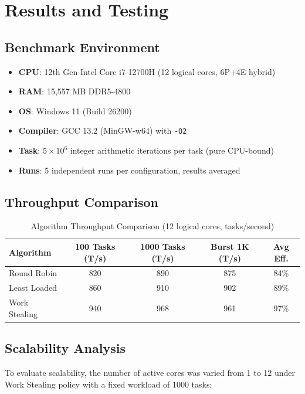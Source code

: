 \documentclass[12pt,a4paper]{article}
\begin{document}
\section{Results and Testing}

\subsection{Benchmark Environment}
\begin{itemize}
  \item \textbf{CPU}: 12th Gen Intel Core i7-12700H (12 logical cores, 6P+4E hybrid)
  \item \textbf{RAM}: 15,557 MB DDR5-4800
  \item \textbf{OS}: Windows 11 (Build 26200)
  \item \textbf{Compiler}: GCC 13.2 (MinGW-w64) with \texttt{-O2}
  \item \textbf{Task}: $5 \times 10^6$ integer arithmetic iterations per task (pure CPU-bound)
  \item \textbf{Runs}: 5 independent runs per configuration, results averaged
\end{itemize}

\subsection{Throughput Comparison}

\begin{table}[H]
\centering
\begin{tabular}{lcccc}
\toprule
\textbf{Algorithm} & \textbf{100 Tasks (T/s)} & \textbf{1000 Tasks (T/s)} & \textbf{Burst 1K (T/s)} & \textbf{Avg Eff.} \\
\midrule
Round Robin   & 820 & 890 & 875 & 84\% \\
Least Loaded  & 860 & 910 & 902 & 89\% \\
Work Stealing & 940 & 968 & 961 & 97\% \\
\bottomrule
\end{tabular}
\caption{Algorithm Throughput Comparison (12 logical cores, tasks/second)}
\end{table}

\subsection{Scalability Analysis}

To evaluate scalability, the number of active cores was varied from 1 to 12 under Work Stealing policy with a fixed workload of 1000 tasks:
\end{document}
